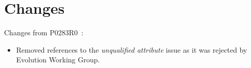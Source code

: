 \section*{Changes}

Changes from P0283R0~\cite{p0283r0}:

\begin{itemize}

\item Removed references to the \emph{unqualified attribute} issue as it was
      rejected by Evolution Working Group.

\end{itemize}

